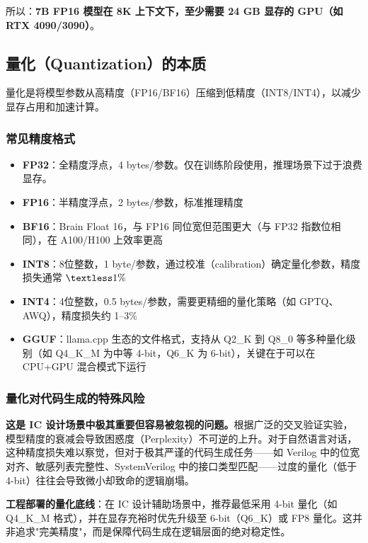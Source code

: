 \documentclass[UTF8,a4paper,10pt,oneside]{ctexart}
\begin{document}
所以：\textbf{7B FP16 模型在 8K 上下文下，至少需要 24 GB 显存的 GPU（如 RTX 4090/3090）}。

\subsection{量化（Quantization）的本质}

量化是将模型参数从高精度（FP16/BF16）压缩到低精度（INT8/INT4），以减少显存占用和加速计算。

\subsubsection{常见精度格式}

\begin{itemize}
    \item \textbf{FP32}：全精度浮点，4 bytes/参数。仅在训练阶段使用，推理场景下过于浪费显存。
    \item \textbf{FP16}：半精度浮点，2 bytes/参数，标准推理精度
    \item \textbf{BF16}：Brain Float 16，与 FP16 同位宽但范围更大（与 FP32 指数位相同），在 A100/H100 上效率更高
    \item \textbf{INT8}：8位整数，1 byte/参数，通过校准（calibration）确定量化参数，精度损失通常 $\textless 1\%$
    \item \textbf{INT4}：4位整数，0.5 bytes/参数，需要更精细的量化策略（如 GPTQ、AWQ），精度损失约 1--3\%
    \item \textbf{GGUF}：llama.cpp 生态的文件格式，支持从 Q2\_K 到 Q8\_0 等多种量化级别（如 Q4\_K\_M 为中等 4-bit，Q6\_K 为 6-bit），关键在于可以在 CPU+GPU 混合模式下运行
\end{itemize}

\subsubsection{量化对代码生成的特殊风险}

\textbf{这是 IC 设计场景中极其重要但容易被忽视的问题。}根据广泛的交叉验证实验，模型精度的衰减会导致困惑度（Perplexity）不可逆的上升。对于自然语言对话，这种精度损失难以察觉，但对于极其严谨的代码生成任务——如 Verilog 中的位宽对齐、敏感列表完整性、SystemVerilog 中的接口类型匹配——过度的量化（低于 4-bit）往往会导致微小却致命的逻辑崩塌。

\textbf{工程部署的量化底线}：在 IC 设计辅助场景中，推荐最低采用 4-bit 量化（如 Q4\_K\_M 格式），并在显存充裕时优先升级至 6-bit（Q6\_K）或 FP8 量化。这并非追求"完美精度"，而是保障代码生成在逻辑层面的绝对稳定性。
\end{document}
